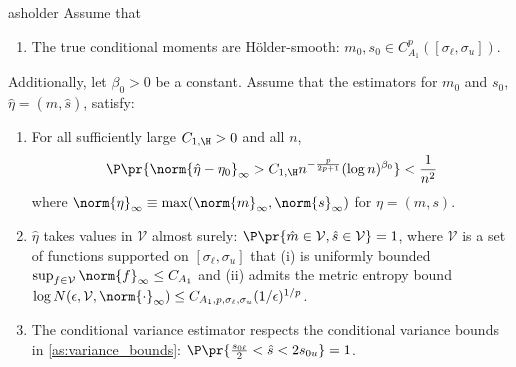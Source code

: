 \documentclass[12pt, reqno]{amsart}
\newcommand{\sigl}{\sigma_\ell}
\newcommand{\sigu}{\sigma_u}
\newcommand{\hatm}{\hat m}
\newcommand{\hats}{\hat s}
\newcommand{\hateta}{\hat\eta}
\numberwithin{equation}{section}
\begin{document}
\begin{restatable}{as}{holder}
\label{as:holder}  Assume that
\begin{enumerate}
  \item  The true conditional moments are H\"older-smooth: $m_0, s_0 \in C_{A_1}^p([\sigl,\sigu])$.
\end{enumerate}

Additionally, let $\beta_0 > 0$ be a constant.   Assume
that the  estimators for $m_{0}$ and $s_0$, $\hateta = (\hatm, \hats)$, satisfy:
\begin{enumerate}[resume]
    \item For all
    sufficiently large $C_{1,\H} > 0$ and all $n$, \[
\P\pr{\norm{
  \hateta - \eta_0
}_\infty > C_{1,\H} n^{-
\frac{p}
    {2p+1}} (\log n)^{\beta_0}} < \frac{1}{n^2}
    \] where $\norm{\eta}_\infty \equiv \max(\norm{m}_\infty, \norm{s}_\infty)$ for $\eta
     =(m,s)$.
    \item  $\hateta$ takes values in $\mathcal V$ almost surely: $\P
    \pr{\hatm\in
    \mathcal V, \hats \in \mathcal V} = 1$, where $\mathcal{V}$ is a set of
functions supported on $[\sigl, \sigu]$ that (i) is uniformly bounded $\sup_{f \in
\mathcal V}
\norm{f}_\infty \le C_{A_1}$ and (ii) admits the metric entropy bound $\log N (\epsilon,
\mathcal V, \norm{\cdot}_\infty) \le C_{A_1,p, \sigl,\sigu} (1/\epsilon)^ {1/p}$.
    \item The conditional variance estimator respects the conditional variance bounds in
    \cref{as:variance_bounds}: $\P\pr{\frac{s_{0\ell}}{2} < \hat s < 2s_{0u}} = 1$.
\end{enumerate}
\end{restatable}
\end{document}
